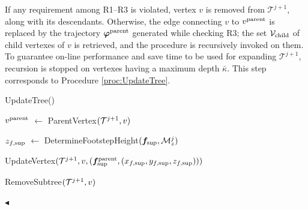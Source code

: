 If any requirement among R1--R3 is violated, vertex $v$ is removed from
$\mathcal{T}^{j+1}$, along with its descendants.
Otherwise, the edge connecting $v$ to $v^{\rm parent}$ is replaced by the
trajectory ${\bm{\varphi}}^{\rm parent}$ generated while checking R3; the set
${\cal V}_{\rm child}$ of child vertexes of $v$ is retrieved, and the procedure
is recursively invoked on them. 
To guarantee on-line performance and save time to be used for expanding
$\mathcal{T}^{j+1}$, recursion is stopped on vertexes having a maximum depth
$\bar{\kappa}$.
This step corresponds to Procedure \ref{proc:UpdateTree}.
\begin{procedure}%
	\small
	\removelatexerror
	
    \caption{UpdateTree()}
	\label{proc:UpdateTree}

	\vspace{2pt}
    \BlankLine
	
	$v^{\rm parent}$ $\leftarrow$ ParentVertex$({\cal T}^{j+1}, v)$\;
    
    $z_{f, \rm sup}$ $\leftarrow$ DetermineFootstepHeight$({\bm{f}}_{\rm sup}, {\cal M}_z^j)$\;
    
    UpdateVertex$({\cal T}^{j+1}, v, ({\bm{f}}_{\rm sup}^{\rm parent}, (x_{f, \rm sup}, y_{f, \rm sup}, z_{f, \rm sup})))$\;
    
	{
 	    RemoveSubtree$({\cal T}^{j+1}, v)$\; 	
 	}
	 
    \Return\;   
	
\end{procedure}
\hfill $\blacktriangleleft$

